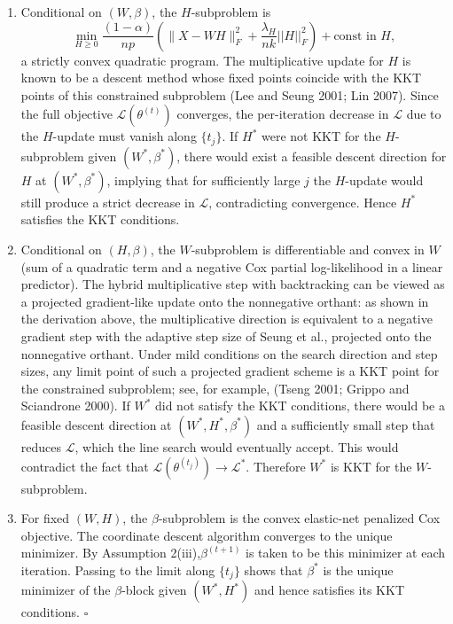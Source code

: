 \documentclass[
]{article}
\begin{document}
\begin{enumerate}
\def\labelenumi{(\roman{enumi})}
\item
  Conditional on \((W,\beta)\), the \(H\)-subproblem is \begin{equation}
    \min_{H \geq 0}\frac{(1-\alpha)}{np}(\lVert X-WH \rVert_F^2 + \frac{\lambda_H}{nk}||H||_F^2) + \text{const in $H$},\nonumber
  \end{equation} a strictly convex quadratic program. The multiplicative
  update for \(H\) is known to be a descent method whose fixed points
  coincide with the KKT points of this constrained subproblem (Lee and
  Seung 2001; Lin 2007). Since the full objective
  \(\mathcal{L}(\theta^{(t)})\) converges, the per-iteration decrease in
  \(\mathcal{L}\) due to the \(H\)-update must vanish along \(\{t_j\}\).
  If \(H^*\) were not KKT for the \(H\)-subproblem given
  \((W^*,\beta^*)\), there would exist a feasible descent direction for
  \(H\) at \((W^*,\beta^*)\), implying that for sufficiently large \(j\)
  the \(H\)-update would still produce a strict decrease in
  \(\mathcal{L}\), contradicting convergence. Hence \(H^*\) satisfies
  the KKT conditions.
\item
  Conditional on \((H,\beta)\), the \(W\)-subproblem is differentiable
  and convex in \(W\) (sum of a quadratic term and a negative Cox
  partial log-likelihood in a linear predictor). The hybrid
  multiplicative step with backtracking can be viewed as a projected
  gradient-like update onto the nonnegative orthant: as shown in the
  derivation above, the multiplicative direction is equivalent to a
  negative gradient step with the adaptive step size of Seung et al.,
  projected onto the nonnegative orthant. Under mild conditions on the
  search direction and step sizes, any limit point of such a projected
  gradient scheme is a KKT point for the constrained subproblem; see,
  for example, (Tseng 2001; Grippo and Sciandrone 2000). If \(W^*\) did
  not satisfy the KKT conditions, there would be a feasible descent
  direction at \((W^*,H^*,\beta^*)\) and a sufficiently small step that
  reduces \(\mathcal{L}\), which the line search would eventually
  accept. This would contradict the fact that
  \(\mathcal{L}(\theta^{(t_j)})\to\mathcal{L}^*\). Therefore \(W^*\) is
  KKT for the \(W\)-subproblem.
\item
  For fixed \((W,H)\), the \(\beta\)-subproblem is the convex
  elastic-net penalized Cox objective. The coordinate descent algorithm
  converges to the unique minimizer. By Assumption
  2(iii),\(\beta^{(t+1)}\) is taken to be this minimizer at each
  iteration. Passing to the limit along \(\{t_j\}\) shows that
  \(\beta^*\) is the unique minimizer of the \(\beta\)-block given
  \((W^*,H^*)\) and hence satisfies its KKT conditions.
  \hfill\(\square\)
\end{enumerate}
\end{document}
